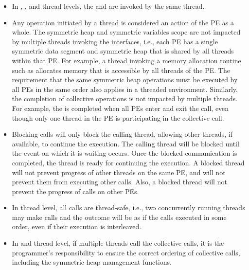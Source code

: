 \begin{itemize}
\item
In , , and  thread
levels, the  and  are invoked by the same thread.
 
\item
Any \openshmem{} operation initiated by a thread is considered an action of the \ac{PE} as a whole.
The symmetric heap and symmetric variables scope
are not impacted by multiple threads invoking the
\openshmem{} interfaces, i.e., 
each \ac{PE} has a single symmetric data segment and symmetric heap that is shared by
all threads within that \ac{PE}.  For example, a thread invoking a memory allocation
routine such as  
allocates memory that is accessible by all threads of the \ac{PE}. 
The requirement that the same symmetric heap operations must
be executed by all \acp{PE} in the same order also applies in a threaded
environment. Similarly, the completion of collective operations is not impacted by multiple threads. 
For example, the  is completed when all \acp{PE} enter and
exit the  call, even though only one thread in the \ac{PE} is
participating in the collective call. 

\item Blocking \openshmem{} calls will only block the calling thread, allowing
other threads, if available, to continue the execution. The calling thread will be blocked until the
event on which it is waiting occurs. Once the blocked communication is
completed, the thread is ready for continuing the execution. A blocked thread
will not prevent progress of other threads on the same \ac{PE}, and will not
prevent them from executing other \openshmem{} calls. Also, a blocked thread
will not prevent the progress of \openshmem{} calls on other \acp{PE}. 

\item In  thread level, all \openshmem{} calls are thread-safe, 
i.e., two concurrently running threads may make \openshmem{} calls and the outcome will be as if the calls executed in
some order, even if their execution is interleaved.

\item In  and  thread level, 
if multiple threads call the collective calls, it is the programmer's responsibility to ensure the correct ordering of
collective calls, including the symmetric heap management functions.

\end{itemize} 

